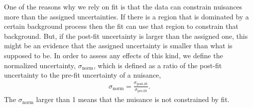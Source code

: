 One of the reasons why we rely on fit is that the data can constrain nuisances 
more than the assigned uncertainties. If there is a region that is dominated by 
a certain background process then the fit can use that region to constrain that 
background. But, if the post-fit uncertainty is larger than the assigned one, 
this might be an evidence that the assigned uncertainty is smaller than what is 
supposed to be. In order to assess any effects of this kind, we define the 
normalized uncertainty, $\sigma_{\textrm{norm}}$, which is defined as a 
ratio of the post-fit uncertainty to the pre-fit uncertainty of a nuisance, 
\begin{eqnarray} 
\sigma_{\textrm{norm}} = \frac{\sigma_{\textrm{post-fit}}}{\sigma_{\textrm{pre-fit}}}. 
\end{eqnarray} 
The $\sigma_{\textrm{norm}}$ larger than 1 means that the nuisance is not constrained by 
fit.


